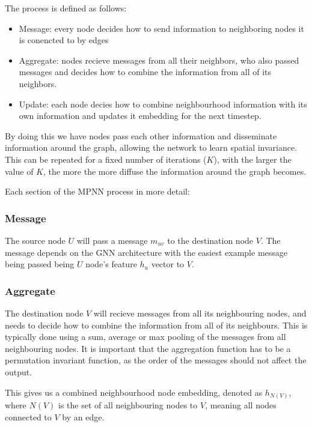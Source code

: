 \documentclass[../main.tex]{subfiles}
\begin{document}
    The process is defined as follows:
    \begin{itemize}
        \item Message: every node decides how to send information to neighboring nodes it is conencted to by edges
        \item Aggregate: nodes recieve messages from all their neighbors, who also passed messages and decides how to combine the information from all of its neighbors. 
        \item Update: each node decies how to combine neighbourhood information with its own information and updates it embedding for the next timestep. 
    \end{itemize}

    By doing this we have nodes pass each other information and disseminate information around the graph, allowing the network to learn spatial invariance.  This can be repeated for a fixed number of iterations ($K$), with the larger the value of $K$, the more the more diffuse the information around the graph becomes.

    Each section of the MPNN process in more detail:

    \subsubsection{Message}

    The source node $U$ will pass a message $m_{uv}$ to the destination node $V$. The message depends on the GNN architecture with the easiest example message being passed being $U$ node's feature $h_u$ vector to $V$.

    \subsubsection{Aggregate}

    The destination node $V$ will recieve messages from all its neighbouring nodes, and needs to decide how to combine the information from all of its neighbours. This is typically done using a sum, average or max pooling of the messages from all neighbouring nodes. It is important that the aggregation function has to be a permutation invariant function, as the order of the messages should not affect the output. 

    This gives us a combined neighbourhood node embedding, denoted as $h_{N(V)}$, where $N(V)$ is the set of all neighbouring nodes to $V$, meaning all nodes connected to $V$ by an edge. 
\end{document}
